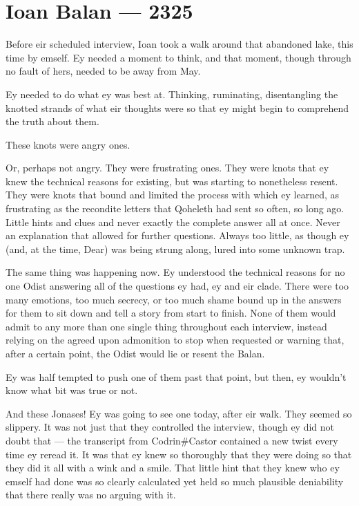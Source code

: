\hypertarget{ioan-balan-2325}{%
\chapter{Ioan Balan — 2325}\label{ioan-balan-2325}}

Before eir scheduled interview, Ioan took a walk around that abandoned lake, this time by emself. Ey needed a moment to think, and that moment, though through no fault of hers, needed to be away from May.

Ey needed to do what ey was best at. Thinking, ruminating, disentangling the knotted strands of what eir thoughts were so that ey might begin to comprehend the truth about them.

These knots were angry ones.

Or, perhaps not angry. They were frustrating ones. They were knots that ey knew the technical reasons for existing, but was starting to nonetheless resent. They were knots that bound and limited the process with which ey learned, as frustrating as the recondite letters that Qoheleth had sent so often, so long ago. Little hints and clues and never exactly the complete answer all at once. Never an explanation that allowed for further questions. Always too little, as though ey (and, at the time, Dear) was being strung along, lured into some unknown trap.

The same thing was happening now. Ey understood the technical reasons for no one Odist answering all of the questions ey had, ey and eir clade. There were too many emotions, too much secrecy, or too much shame bound up in the answers for them to sit down and tell a story from start to finish. None of them would admit to any more than one single thing throughout each interview, instead relying on the agreed upon admonition to stop when requested or warning that, after a certain point, the Odist would lie or resent the Balan.

Ey was half tempted to push one of them past that point, but then, ey wouldn't know what bit was true or not.

And these Jonases! Ey was going to see one today, after eir walk. They seemed so slippery. It was not just that they controlled the interview, though ey did not doubt that — the transcript from Codrin\#Castor contained a new twist every time ey reread it. It was that ey knew so thoroughly that they were doing so that they did it all with a wink and a smile. That little hint that they knew who ey emself had done was so clearly calculated yet held so much plausible deniability that there really was no arguing with it.

